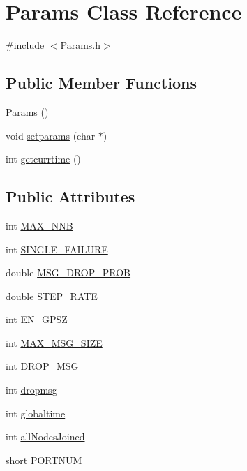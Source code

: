\hypertarget{class_params}{\section{\-Params \-Class \-Reference}
\label{dc/d1d/class_params}
}


{\ttfamily \#include $<$\-Params.\-h$>$}

\subsection*{\-Public \-Member \-Functions}
\begin{DoxyCompactItemize}
\item 
\hyperlink{class_params_a1c0d445a3ea36e3b4d8696c55217fdd2}{\-Params} ()
\item 
void \hyperlink{class_params_a6b92907974ab5a62c22d1fb4eff45418}{setparams} (char $\ast$)
\item 
int \hyperlink{class_params_a4c0beb0ffc7e88794296821e9525dc75}{getcurrtime} ()
\end{DoxyCompactItemize}
\subsection*{\-Public \-Attributes}
\begin{DoxyCompactItemize}
\item 
int \hyperlink{class_params_ab0ec3d0aa36da465237f4b5d9bf1856b}{\-M\-A\-X\-\_\-\-N\-N\-B}
\item 
int \hyperlink{class_params_a6813393a8b7ebdf01015fe06eaa6c146}{\-S\-I\-N\-G\-L\-E\-\_\-\-F\-A\-I\-L\-U\-R\-E}
\item 
double \hyperlink{class_params_acbca0b55b1d12c20230f58e6d46d767b}{\-M\-S\-G\-\_\-\-D\-R\-O\-P\-\_\-\-P\-R\-O\-B}
\item 
double \hyperlink{class_params_a5631d479c6912c8992ccfe38ea6b4d2a}{\-S\-T\-E\-P\-\_\-\-R\-A\-T\-E}
\item 
int \hyperlink{class_params_ab60075ee5e58043a7bbc4d109f392ab4}{\-E\-N\-\_\-\-G\-P\-S\-Z}
\item 
int \hyperlink{class_params_a1a035f507c21541723dc558a348db075}{\-M\-A\-X\-\_\-\-M\-S\-G\-\_\-\-S\-I\-Z\-E}
\item 
int \hyperlink{class_params_a6e254d50de368dd9acd255c41178863f}{\-D\-R\-O\-P\-\_\-\-M\-S\-G}
\item 
int \hyperlink{class_params_ad57a790f4419c53a8e151d1e2e413454}{dropmsg}
\item 
int \hyperlink{class_params_ae261b965535fa59464980c03e521a554}{globaltime}
\item 
int \hyperlink{class_params_a492930a2987db99094640813eba1deff}{all\-Nodes\-Joined}
\item 
short \hyperlink{class_params_a390dcbc410d823fc387c0ef138f2e1aa}{\-P\-O\-R\-T\-N\-U\-M}
\end{DoxyCompactItemize}


